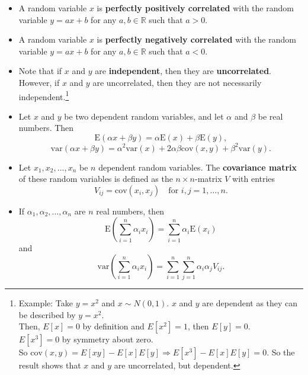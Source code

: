 \begin{itemize}[label=\textbullet]
    \item A random variable \( x \) is \textbf{perfectly positively correlated} with the random variable \( y = ax + b \) for any \( a, b \in \mathbb{R} \) such that \( a > 0 \).
    \item A random variable \( x \) is \textbf{perfectly negatively correlated} with the random variable \( y = ax + b \) for any \( a, b \in \mathbb{R} \) such that \( a < 0 \).
    \item Note that if \( x \) and \( y \) are \textbf{independent}, then they are \textbf{uncorrelated}. However, if \( x \) and \( y \) are uncorrelated, then they are not necessarily independent.\footnote[]{Example: Take $y = x^2$ and $x \sim N(0,1)$. $x$ and $y$ are dependent as they can be described by $y = x^2$. \\ \bigskip
    Then, $E[x] = 0$ by definition and $E[x^2] = 1$, then $E[y] = 0$.\\ \bigskip $E[x^3] = 0$ by symmetry about zero. \\ \bigskip So $\text{cov}(x, y)  = E[xy] - E[x]E[y] \Rightarrow E[x^3] - E[x]E[y] = 0$. So the result shows that $x$ and $y$ are uncorrelated, but dependent.}
\end{itemize}



\begin{itemize}[label=\textbullet]
    \item Let \( x \) and \( y \) be two dependent random variables, and let \( \alpha \) and \( \beta \) be real numbers. Then
    \[
    \text{E}(\alpha x + \beta y) = \alpha \text{E}(x) + \beta \text{E}(y),
    \]
    \[
    \text{var}(\alpha x + \beta y) = \alpha^2 \text{var}(x) + 2\alpha\beta \text{cov}(x, y) + \beta^2 \text{var}(y).
    \]
    \item Let \( x_1, x_2, \ldots, x_n \) be \( n \) dependent random variables. The \textbf{covariance matrix} of these random variables is defined as the \( n \times n \)-matrix \( V \) with entries
    \[
    V_{ij} = \text{cov}(x_i, x_j) \quad \text{for } i, j = 1, \ldots, n.
    \]
    \item If \( \alpha_1, \alpha_2, \ldots, \alpha_n \) are \( n \) real numbers, then
    \[
    \text{E} \left( \sum_{i=1}^n \alpha_i x_i \right) = \sum_{i=1}^n \alpha_i \text{E}(x_i)
    \]
    and
    \[
    \text{var} \left( \sum_{i=1}^n \alpha_i x_i \right) = \sum_{i=1}^n \sum_{j=1}^n \alpha_i \alpha_j V_{ij}.
    \]
\end{itemize}

